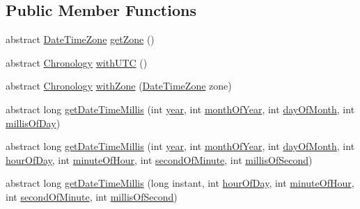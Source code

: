 \subsection*{Public Member Functions}
\begin{DoxyCompactItemize}
\item 
abstract \hyperlink{classorg_1_1joda_1_1time_1_1_date_time_zone}{Date\-Time\-Zone} \hyperlink{classorg_1_1joda_1_1time_1_1_chronology_abfeffecce6d99ee113ab5c6d3396aa21}{get\-Zone} ()
\item 
abstract \hyperlink{classorg_1_1joda_1_1time_1_1_chronology}{Chronology} \hyperlink{classorg_1_1joda_1_1time_1_1_chronology_ab766a75c1e8d6daf119dc313088d9d53}{with\-U\-T\-C} ()
\item 
abstract \hyperlink{classorg_1_1joda_1_1time_1_1_chronology}{Chronology} \hyperlink{classorg_1_1joda_1_1time_1_1_chronology_afafe88d4ed1ba97358f48b0e4ff38a43}{with\-Zone} (\hyperlink{classorg_1_1joda_1_1time_1_1_date_time_zone}{Date\-Time\-Zone} zone)
\item 
abstract long \hyperlink{classorg_1_1joda_1_1time_1_1_chronology_aba7312d21a3daa7b549cc4c0b6bb130e}{get\-Date\-Time\-Millis} (int \hyperlink{classorg_1_1joda_1_1time_1_1_chronology_a38f8da7b9552802bdb402352b57a7844}{year}, int \hyperlink{classorg_1_1joda_1_1time_1_1_chronology_ad681295b93c8743ccdd5070ec3e03c8a}{month\-Of\-Year}, int \hyperlink{classorg_1_1joda_1_1time_1_1_chronology_a1b308ac0dfcc5b96a51dc97320bf3191}{day\-Of\-Month}, int \hyperlink{classorg_1_1joda_1_1time_1_1_chronology_aeb9fee45c40ba6e09ca507f630ec3417}{millis\-Of\-Day})
\item 
abstract long \hyperlink{classorg_1_1joda_1_1time_1_1_chronology_afb5ccbc53d72febdd662a27edc1ae654}{get\-Date\-Time\-Millis} (int \hyperlink{classorg_1_1joda_1_1time_1_1_chronology_a38f8da7b9552802bdb402352b57a7844}{year}, int \hyperlink{classorg_1_1joda_1_1time_1_1_chronology_ad681295b93c8743ccdd5070ec3e03c8a}{month\-Of\-Year}, int \hyperlink{classorg_1_1joda_1_1time_1_1_chronology_a1b308ac0dfcc5b96a51dc97320bf3191}{day\-Of\-Month}, int \hyperlink{classorg_1_1joda_1_1time_1_1_chronology_a37626b46ca11997b969bdf58ab84ce59}{hour\-Of\-Day}, int \hyperlink{classorg_1_1joda_1_1time_1_1_chronology_a8f34665d3a0651168f5706303f0fe527}{minute\-Of\-Hour}, int \hyperlink{classorg_1_1joda_1_1time_1_1_chronology_aced7aa86fcbf78c120494e55cde9e5cf}{second\-Of\-Minute}, int \hyperlink{classorg_1_1joda_1_1time_1_1_chronology_ae327f2dac4d8175238ebfac9b0bb5f57}{millis\-Of\-Second})
\item 
abstract long \hyperlink{classorg_1_1joda_1_1time_1_1_chronology_a064a2296101c248f2a0ca335f74db926}{get\-Date\-Time\-Millis} (long instant, int \hyperlink{classorg_1_1joda_1_1time_1_1_chronology_a37626b46ca11997b969bdf58ab84ce59}{hour\-Of\-Day}, int \hyperlink{classorg_1_1joda_1_1time_1_1_chronology_a8f34665d3a0651168f5706303f0fe527}{minute\-Of\-Hour}, int \hyperlink{classorg_1_1joda_1_1time_1_1_chronology_aced7aa86fcbf78c120494e55cde9e5cf}{second\-Of\-Minute}, int \hyperlink{classorg_1_1joda_1_1time_1_1_chronology_ae327f2dac4d8175238ebfac9b0bb5f57}{millis\-Of\-Second})

\end{DoxyCompactItemize}
